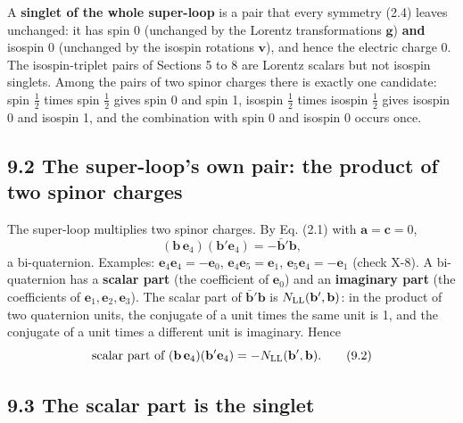 \documentclass[
  10pt,
]{article}
\begin{document}
A \textbf{singlet of the whole super-loop} is a pair that every symmetry
(2.4) leaves unchanged: it has spin 0 (unchanged by the Lorentz
transformations \(\mathbf g\)) \textbf{and} isospin 0 (unchanged by the
isospin rotations \(\mathbf v\)), and hence the electric charge 0. The
isospin-triplet pairs of Sections 5 to 8 are Lorentz scalars but not
isospin singlets. Among the pairs of two spinor charges there is exactly
one candidate: spin \(\tfrac12\) times spin \(\tfrac12\) gives spin 0
and spin 1, isospin \(\tfrac12\) times isospin \(\tfrac12\) gives
isospin 0 and isospin 1, and the combination with spin 0 and isospin 0
occurs once.

\hypertarget{the-super-loops-own-pair-the-product-of-two-spinor-charges}{%
\subsection{9.2 The super-loop's own pair: the product of two spinor
charges}\label{the-super-loops-own-pair-the-product-of-two-spinor-charges}}

The super-loop multiplies two spinor charges. By Eq. (2.1) with
\(\mathbf a=\mathbf c=0\),
\[(\mathbf b\,\mathbf e_4)(\mathbf b'\mathbf e_4)=-\bar{\mathbf b}'\mathbf b , \tag{9.1}\]
a bi-quaternion. Examples: \(\mathbf e_4\mathbf e_4=-\mathbf e_0\),
\(\mathbf e_4\mathbf e_5=\mathbf e_1\),
\(\mathbf e_5\mathbf e_4=-\mathbf e_1\) (check X-8). A bi-quaternion has
a \textbf{scalar part} (the coefficient of \(\mathbf e_0\)) and an
\textbf{imaginary part} (the coefficients of
\(\mathbf e_1,\mathbf e_2,\mathbf e_3\)). The scalar part of
\(\bar{\mathbf b}'\mathbf b\) is \(N_{\rm LL}(\mathbf b',\mathbf b)\):
in the product of two quaternion units, the conjugate of a unit times
the same unit is 1, and the conjugate of a unit times a different unit
is imaginary. Hence
\[\text{scalar part of }(\mathbf b\,\mathbf e_4)(\mathbf b'\mathbf e_4)=-N_{\rm LL}(\mathbf b',\mathbf b). \tag{9.2}\]

\hypertarget{the-scalar-part-is-the-singlet}{%
\subsection{9.3 The scalar part is the
singlet}\label{the-scalar-part-is-the-singlet}}
\end{document}
